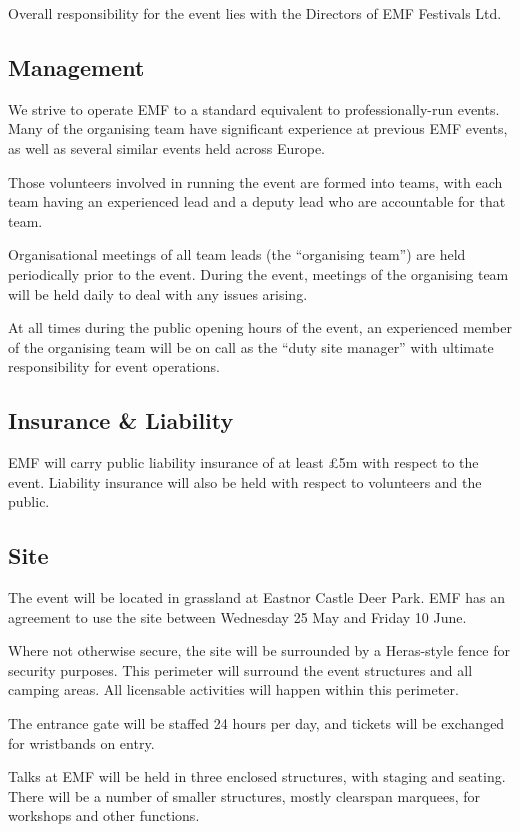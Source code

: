 Overall responsibility for the event lies with the Directors of EMF Festivals Ltd.

\subsection{Management}
We strive to operate EMF to a standard equivalent to professionally-run events.
Many of the organising team have significant experience at previous EMF events,
as well as several similar events held across Europe.

Those volunteers involved in running the event are formed into teams, with each
team having an experienced lead and a deputy lead who are accountable for that
team.

Organisational meetings of all team leads (the ``organising team'') are held
periodically prior to the event.  During the event, meetings of the organising
team will be held daily to deal with any issues arising.

At all times during the public opening hours of the event, an experienced member
of the organising team will be on call as the ``duty site manager'' with
ultimate responsibility for event operations.

\subsection{Insurance \& Liability}

EMF will carry public liability insurance of at least £5m with respect to the event.
Liability insurance will also be held with respect to volunteers and the public.

\subsection{Site}
The event will be located in grassland at Eastnor Castle Deer Park. EMF has
an agreement to use the site between Wednesday 25 May and Friday 10 June.

Where not otherwise secure, the site will be surrounded by a Heras-style fence
for security purposes.  This perimeter will surround the event structures and all
camping areas. All licensable activities will happen within this perimeter.

The entrance gate will be staffed 24 hours per day, and tickets will be
exchanged for wristbands on entry.

Talks at EMF will be held in three enclosed structures, with staging and
seating. There will be a number of smaller structures, mostly clearspan marquees,
for workshops and other functions.

